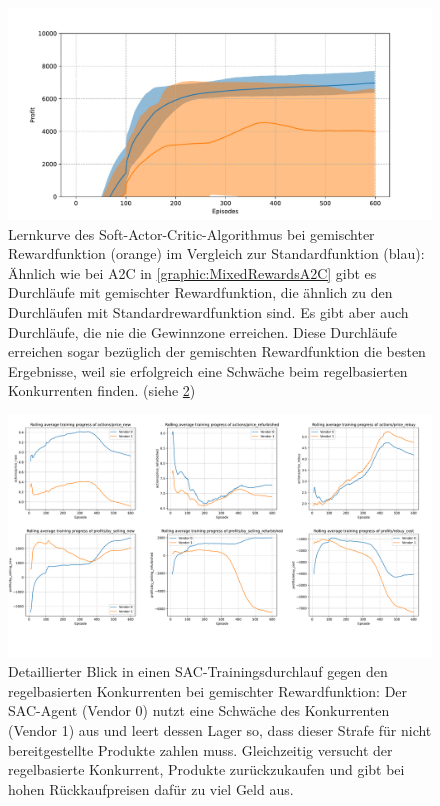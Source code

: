 \begin{figure}[htb]
	\centering
	\includegraphics[width=\textwidth]{appendix/mixed_rewards_sac.pdf}
	\caption{
		Lernkurve des Soft-Actor-Critic-Algorithmus bei gemischter Rewardfunktion (orange) im Vergleich zur Standardfunktion (blau):
		Ähnlich wie bei A2C in \ref{graphic:MixedRewardsA2C} gibt es Durchläufe mit gemischter Rewardfunktion, die ähnlich zu den Durchläufen mit Standardrewardfunktion sind.
		Es gibt aber auch Durchläufe, die nie die Gewinnzone erreichen.
		Diese Durchläufe erreichen sogar bezüglich der gemischten Rewardfunktion die besten Ergebnisse, weil sie erfolgreich eine Schwäche beim regelbasierten Konkurrenten finden. (siehe \ref{graphic:ExplanationUnnormalSAC})
	}
	\label{graphic:MixedRewardsSAC}
\end{figure}
\begin{figure}[htb]
	\centering
	\includegraphics[width=\textwidth]{appendix/explanation_unnormal_sac.pdf}
	\caption{
		Detaillierter Blick in einen SAC-Trainingsdurchlauf gegen den regelbasierten Konkurrenten bei gemischter Rewardfunktion:
		Der SAC-Agent (Vendor 0) nutzt eine Schwäche des Konkurrenten (Vendor 1) aus und leert dessen Lager so, dass dieser Strafe für nicht bereitgestellte Produkte zahlen muss.
		Gleichzeitig versucht der regelbasierte Konkurrent, Produkte zurückzukaufen und gibt bei hohen Rückkaufpreisen dafür zu viel Geld aus.
	}
	\label{graphic:ExplanationUnnormalSAC}
\end{figure}
